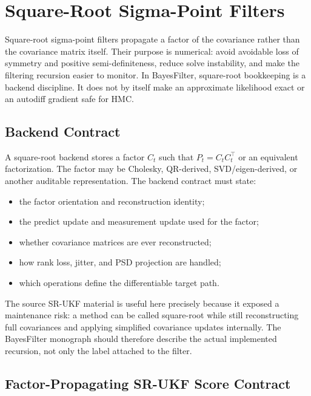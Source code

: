\chapter{Square-Root Sigma-Point Filters}
\label{ch:bf-square-root-sigma-point}

Square-root sigma-point filters propagate a factor of the covariance rather
than the covariance matrix itself.  Their purpose is numerical: avoid avoidable
loss of symmetry and positive semi-definiteness, reduce solve instability, and
make the filtering recursion easier to monitor.  In BayesFilter, square-root
bookkeeping is a backend discipline.  It does not by itself make an
approximate likelihood exact or an autodiff gradient safe for HMC.

\section{Backend Contract}
\label{sec:bf-square-root-contract}

A square-root backend stores a factor $C_t$ such that
$P_t=C_tC_t^\top$ or an equivalent factorization.  The factor may be Cholesky,
QR-derived, SVD/eigen-derived, or another auditable representation.  The
backend contract must state:
\begin{itemize}
  \item the factor orientation and reconstruction identity;
  \item the predict update and measurement update used for the factor;
  \item whether covariance matrices are ever reconstructed;
  \item how rank loss, jitter, and PSD projection are handled;
  \item which operations define the differentiable target path.
\end{itemize}

The source SR-UKF material is useful here precisely because it exposed a
maintenance risk: a method can be called square-root while still reconstructing
full covariances and applying simplified covariance updates internally.  The
BayesFilter monograph should therefore describe the actual implemented
recursion, not only the label attached to the filter.

\section{Factor-Propagating SR-UKF Score Contract}
\label{sec:bf-srukf-factor-propagating-score-contract}

